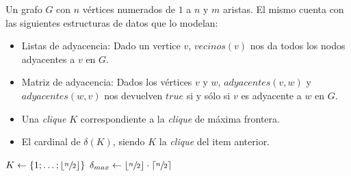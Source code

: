\begin{pseudocodigo}
    \Require Un grafo $G$ con $n$ v\'ertices numerados de $1$ a $n$ y $m$ aristas. El mismo
        cuenta con las siguientes estructuras de datos que lo modelan:
        \begin{itemize}
            \item Listas de adyacencia: Dado un vertice $v$, $vecinos(v)$ nos da todos los
                nodos adyacentes a $v$ en $G$.

            \item Matriz de adyacencia: Dados los v\'ertices $v$ y $w$, $adyacentes(v,w)$ y
                $adyacentes(w,v)$ nos devuelven $true$ si y s\'olo si $v$ es adyacente
                a $w$ en $G$.
        \end{itemize}
    \Ensure\Statex
        \begin{itemize}
            \item Una \emph{clique} $K$ correspondiente a la \emph{clique} de m\'axima frontera.

            \item El cardinal de $\delta(K)$, siendo $K$ la \emph{clique} del item anterior.
        \end{itemize}

    \Statex
     
        \State $K \gets \left\{1;\dots;\left\lfloor\sfrac{n}{2}\right\rfloor\right\}$ 
        \Statex
        \State $\delta_{max} \gets \left\lfloor\sfrac{n}{2}\right\rfloor\cdot
            \left\lceil\sfrac{n}{2}\right\rceil$ 
        \Statex


\end{pseudocodigo}

